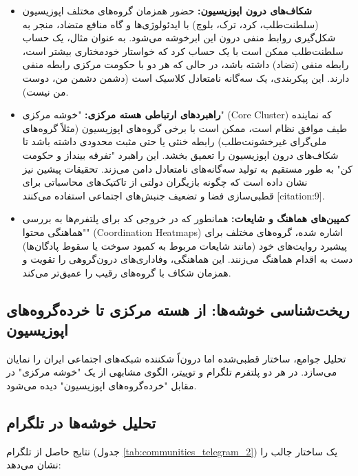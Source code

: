 \documentclass{article}
\begin{document}
	\begin{itemize}
		\item \textbf{شکاف‌های درون اپوزیسیون:} حضور همزمان گروه‌های مختلف اپوزیسیون (سلطنت‌طلب، کرد، ترک، بلوچ) با ایدئولوژی‌ها و گاه منافع متضاد، منجر به شکل‌گیری روابط منفی درون این ابرخوشه می‌شود. به عنوان مثال، یک حساب سلطنت‌طلب ممکن است با یک حساب کرد که خواستار خودمختاری بیشتر است، رابطه منفی (تضاد) داشته باشد، در حالی که هر دو با حکومت مرکزی رابطه منفی دارند. این پیکربندی، یک سه‌گانه نامتعادل کلاسیک است (دشمن دشمن من، دوست من نیست).
		\item \textbf{راهبردهای ارتباطی هسته مرکزی:} "خوشه مرکزی" (Core Cluster) که نماینده طیف موافق نظام است، ممکن است با برخی گروه‌های اپوزیسیون (مثلاً گروه‌های ملی‌گرای غیرخشونت‌طلب) رابطه خنثی یا حتی مثبت محدودی داشته باشد تا شکاف‌های درون اپوزیسیون را تعمیق بخشد. این راهبرد "تفرقه بینداز و حکومت کن" به طور مستقیم به تولید سه‌گانه‌های نامتعادل دامن می‌زند. تحقیقات پیشین نیز نشان داده است که چگونه بازیگران دولتی از تاکتیک‌های محاسباتی برای قطبی‌سازی فضا و تضعیف جنبش‌های اجتماعی استفاده می‌کنند [citation:9].
		\item \textbf{کمپین‌های هماهنگ و شایعات:} همانطور که در خروجی کد برای پلتفرم‌ها به بررسی "هماهنگی محتوا" (Coordination Heatmaps) اشاره شده، گروه‌های مختلف برای پیشبرد روایت‌های خود (مانند شایعات مربوط به کمبود سوخت یا سقوط پادگان‌ها) دست به اقدام هماهنگ می‌زنند. این هماهنگی، وفاداری‌های درون‌گروهی را تقویت و همزمان شکاف با گروه‌های رقیب را عمیق‌تر می‌کند.
	\end{itemize}
	
	\subsection{ریخت‌شناسی خوشه‌ها: از هسته مرکزی تا خرده‌گروه‌های اپوزیسیون}
	تحلیل جوامع، ساختار قطبی‌شده اما درون‌اً شکننده شبکه‌های اجتماعی ایران را نمایان می‌سازد. در هر دو پلتفرم تلگرام و توییتر، الگوی مشابهی از یک "خوشه مرکزی" در مقابل "خرده‌گروه‌های اپوزیسیون" دیده می‌شود.
	
	\subsection{تحلیل خوشه‌ها در تلگرام}
	نتایج حاصل از تلگرام (جدول \ref{tab:communities_telegram_2}) یک ساختار جالب را نشان می‌دهد:
	
\end{document}
